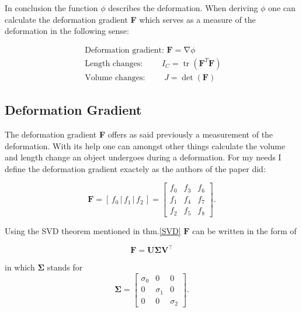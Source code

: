 In conclusion the function $\phi$ describes the deformation. When deriving $\phi$ one can calculate the deformation gradient \textbf{F} which serves as a measure of the deformation in the following sense: 

\[
\begin{array}{l}
{\text { Deformation gradient: }} {\mathbf{F}=\operatorname{\nabla} \phi}
\\
{\text { Length changes: }} {\qquad I_{C}=\operatorname{tr}\left(\mathbf{F}^{T} \mathbf{F}\right)} 
\\ 
{\text { Volume changes: }} {\qquad J=\operatorname{det}(\mathbf{F})}\end{array}
\]



\subsection{Deformation Gradient}
The deformation gradient \textbf{F} offers as said previously a measurement of the deformation. With its help one can amongst other things calculate the volume and length change an object undergoes during a deformation. For my needs I define the deformation gradient exactely as the authors of the paper \cite{Smith:2018:SNF:3191713.3180491} did:

\begin{equation}\label{eq:deformation_gradient}
\textbf{F} = \left[ \,f_0\, \bigg| \,f_1\, \bigg| \,f_2\, \right] = \begin{bmatrix} f_0 & f_3 & f_6 \\ f_1 & f_4 & f_7 \\ f_2 & f_5 & f_8 \end{bmatrix}.
\end{equation}

Using the SVD theorem mentioned in thm.\ref{SVD} $\mathbf{F}$ can be written in the form of

\begin{equation}\label{eq:svd_gradient}
\mathbf{F} = \mathbf{U \Sigma V^\intercal}
\end{equation}

in which $\mathbf{\Sigma}$ stands for
\begin{equation}\label{eq:svd_simga}
\mathbf{\Sigma} = \left[\begin{matrix}  \sigma_0 & 0 & 0 \\ 0 & \sigma_1 & 0 \\ 0 & 0 & \sigma_2 \end{matrix}\right] .
\end{equation}

